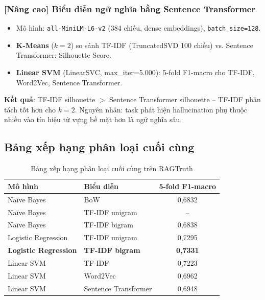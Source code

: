 \documentclass[12pt,a4paper]{article}
\let\oldtextbf\textbf
\renewcommand{\textbf}[1]{\oldtextbf{\textcolor{hcmublue}{#1}}}
\begin{document}
\subsubsection{[Nâng cao] Biểu diễn ngữ nghĩa bằng Sentence Transformer}

\begin{itemize}
    \item Mô hình: \texttt{all-MiniLM-L6-v2} (384 chiều, dense embeddings), \texttt{batch\_size=128}.
    \item \textbf{K-Means} ($k=2$) so sánh TF-IDF (TruncatedSVD 100 chiều) vs. Sentence Transformer: Silhouette Score.
    \item \textbf{Linear SVM} (LinearSVC, max\_iter=5.000): 5-fold F1-macro cho TF-IDF, Word2Vec, Sentence Transformer.
\end{itemize}

\textbf{Kết quả}: TF-IDF silhouette $>$ Sentence Transformer silhouette -- TF-IDF phân tách tốt hơn cho $k=2$. Nguyên nhân: task phát hiện hallucination phụ thuộc nhiều vào tín hiệu từ vựng bề mặt hơn là ngữ nghĩa sâu.

\subsection{Bảng xếp hạng phân loại cuối cùng}

\begin{table}[H]
\centering
\begin{tabular}{|l|l|c|}
\hline
\textbf{Mô hình} & \textbf{Biểu diễn} & \textbf{5-fold F1-macro} \\ \hline
Naïve Bayes & BoW & 0{,}6832 \\ \hline
Naïve Bayes & TF-IDF unigram & -- \\ \hline
Naïve Bayes & TF-IDF bigram & 0{,}6838 \\ \hline
Logistic Regression & TF-IDF unigram & 0{,}7295 \\ \hline
\textbf{Logistic Regression} & \textbf{TF-IDF bigram} & \textbf{0{,}7331} \\ \hline
Linear SVM & TF-IDF & 0{,}7223 \\ \hline
Linear SVM & Word2Vec & 0{,}6962 \\ \hline
Linear SVM & Sentence Transformer & 0{,}6948 \\ \hline
\end{tabular}
\caption{Bảng xếp hạng phân loại cuối cùng trên RAGTruth}
\label{tab:classification_leaderboard}
\end{table}
\end{document}

